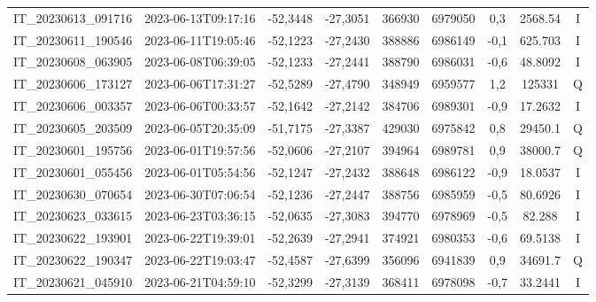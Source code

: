 \begin{center}
\begin{longtable}{lcccccccc}
IT\_20230613\_091716 & 2023-06-13T09:17:16 & -52,3448 & -27,3051 & 366930 & 6979050 & 0,3 & \num[round-precision=3,round-mode=figures,scientific-notation=true]{2568.54} & I \\
IT\_20230611\_190546 & 2023-06-11T19:05:46 & -52,1223 & -27,2430 & 388886 & 6986149 & -0,1 & \num[round-precision=3,round-mode=figures,scientific-notation=true]{625.703} & I \\
IT\_20230608\_063905 & 2023-06-08T06:39:05 & -52,1233 & -27,2441 & 388790 & 6986031 & -0,6 & \num[round-precision=3,round-mode=figures,scientific-notation=true]{48.8092} & I \\
IT\_20230606\_173127 & 2023-06-06T17:31:27 & -52,5289 & -27,4790 & 348949 & 6959577 & 1,2 & \num[round-precision=3,round-mode=figures,scientific-notation=true]{125331} & Q \\
IT\_20230606\_003357 & 2023-06-06T00:33:57 & -52,1642 & -27,2142 & 384706 & 6989301 & -0,9 & \num[round-precision=3,round-mode=figures,scientific-notation=true]{17.2632} & I \\
IT\_20230605\_203509 & 2023-06-05T20:35:09 & -51,7175 & -27,3387 & 429030 & 6975842 & 0,8 & \num[round-precision=3,round-mode=figures,scientific-notation=true]{29450.1} & Q \\
IT\_20230601\_195756 & 2023-06-01T19:57:56 & -52,0606 & -27,2107 & 394964 & 6989781 & 0,9 & \num[round-precision=3,round-mode=figures,scientific-notation=true]{38000.7} & Q \\
IT\_20230601\_055456 & 2023-06-01T05:54:56 & -52,1247 & -27,2432 & 388648 & 6986122 & -0,9 & \num[round-precision=3,round-mode=figures,scientific-notation=true]{18.0537} & I \\
IT\_20230630\_070654 & 2023-06-30T07:06:54 & -52,1236 & -27,2447 & 388756 & 6985959 & -0,5 & \num[round-precision=3,round-mode=figures,scientific-notation=true]{80.6926} & I \\
IT\_20230623\_033615 & 2023-06-23T03:36:15 & -52,0635 & -27,3083 & 394770 & 6978969 & -0,5 & \num[round-precision=3,round-mode=figures,scientific-notation=true]{82.288} & I \\
IT\_20230622\_193901 & 2023-06-22T19:39:01 & -52,2639 & -27,2941 & 374921 & 6980353 & -0,6 & \num[round-precision=3,round-mode=figures,scientific-notation=true]{69.5138} & I \\
IT\_20230622\_190347 & 2023-06-22T19:03:47 & -52,4587 & -27,6399 & 356096 & 6941839 & 0,9 & \num[round-precision=3,round-mode=figures,scientific-notation=true]{34691.7} & Q \\
IT\_20230621\_045910 & 2023-06-21T04:59:10 & -52,3299 & -27,3139 & 368411 & 6978098 & -0,7 & \num[round-precision=3,round-mode=figures,scientific-notation=true]{33.2441} & I \\

\end{longtable}
\end{center}

